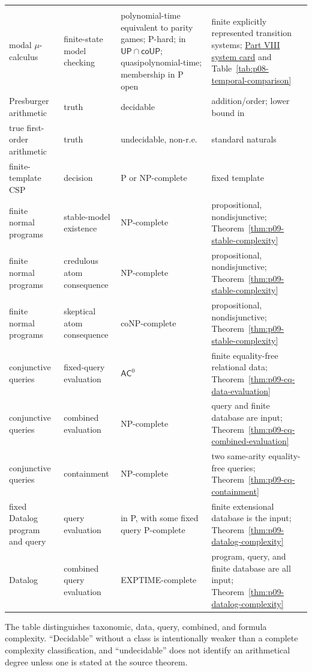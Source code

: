 \begin{longtable}{@{}p{}p{}p{}p{}@{}}
\cite{Kozen1983} \\
modal \(\mu\)-calculus & finite-state model checking & polynomial-time
equivalent to parity games; P-hard; in
\(\mathsf{UP}\cap\mathsf{coUP}\); quasipolynomial-time; membership in P open &
finite explicitly represented transition systems;
\hyperref[entry:p08-modal-mu]{Part VIII system card} and
Table~\ref{tab:p08-temporal-comparison}
\cite{EmersonJutla1999,CaludeJainKhoussainovLiStephan2017} \\
Presburger arithmetic & truth & decidable & addition/order; lower bound in \cite{FischerRabin1974} \\
true first-order arithmetic & truth & undecidable, non-r.e. & standard naturals \cite{Shoenfield1967} \\
finite-template CSP & decision & P or NP-complete & fixed template \cite{Zhuk2020} \\
finite normal programs & stable-model existence & NP-complete & propositional,
nondisjunctive; Theorem~\ref{thm:p09-stable-complexity} \\
finite normal programs & credulous atom consequence & NP-complete &
propositional, nondisjunctive; Theorem~\ref{thm:p09-stable-complexity} \\
finite normal programs & skeptical atom consequence & coNP-complete &
propositional, nondisjunctive; Theorem~\ref{thm:p09-stable-complexity} \\
conjunctive queries & fixed-query evaluation & \(\mathsf{AC}^{0}\) & finite
equality-free relational data; Theorem~\ref{thm:p09-cq-data-evaluation} \\
conjunctive queries & combined evaluation & NP-complete & query and finite
database are input; Theorem~\ref{thm:p09-cq-combined-evaluation} \\
conjunctive queries & containment & NP-complete & two same-arity equality-free
queries; Theorem~\ref{thm:p09-cq-containment} \\
fixed Datalog program and query & query evaluation & in P, with some fixed
query P-complete & finite extensional database is the input;
Theorem~\ref{thm:p09-datalog-complexity} \\
Datalog & combined query evaluation & EXPTIME-complete & program, query, and
finite database are all input; Theorem~\ref{thm:p09-datalog-complexity} \\
\bottomrule
\end{longtable}

The table distinguishes taxonomic, data, query, combined, and formula
complexity. ``Decidable''
without a class is intentionally weaker than a complete complexity
classification, and ``undecidable'' does not identify an arithmetical degree
unless one is stated at the source theorem.
